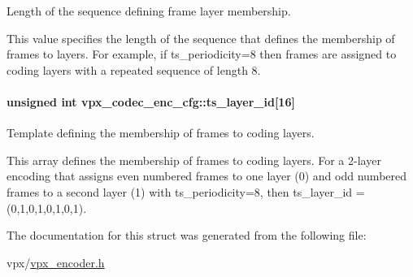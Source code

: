 \-Length of the sequence defining frame layer membership. 

\-This value specifies the length of the sequence that defines the membership of frames to layers. \-For example, if ts\-\_\-periodicity=8 then frames are assigned to coding layers with a repeated sequence of length 8. \hypertarget{structvpx__codec__enc__cfg_a4d105d2470dbfb7210b33d298f1cf1f6}{
\paragraph[{ts\-\_\-layer\-\_\-id}]{\setlength{\rightskip}{0pt plus 5cm}unsigned int {\bf vpx\-\_\-codec\-\_\-enc\-\_\-cfg\-::ts\-\_\-layer\-\_\-id}\mbox{[}16\mbox{]}}}\label{structvpx__codec__enc__cfg_a4d105d2470dbfb7210b33d298f1cf1f6}


\-Template defining the membership of frames to coding layers. 

\-This array defines the membership of frames to coding layers. \-For a 2-\/layer encoding that assigns even numbered frames to one layer (0) and odd numbered frames to a second layer (1) with ts\-\_\-periodicity=8, then ts\-\_\-layer\-\_\-id = (0,1,0,1,0,1,0,1). 

\-The documentation for this struct was generated from the following file\-:\begin{DoxyCompactItemize}
\item 
vpx/\hyperlink{vpx__encoder_8h}{vpx\-\_\-encoder.\-h}\end{DoxyCompactItemize}
